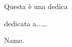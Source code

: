 \begin{dedication}
Questa è una dedica
\par   %
\vspace{2\baselineskip}
dedicata a...\ldots

\vspace{\baselineskip}
Name.
\end{dedication}